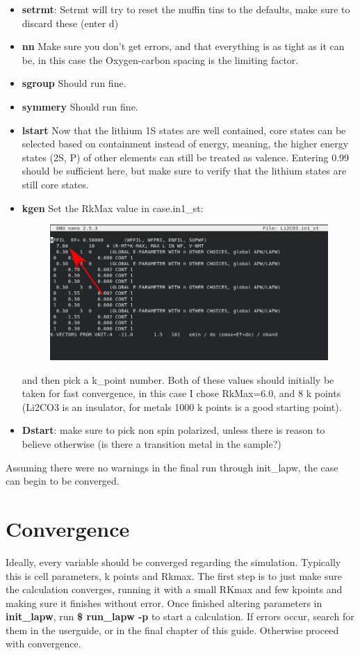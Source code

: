 \documentclass[12pt]{article}
\begin{document}
\begin{itemize}
	\item \textbf{setrmt}: Setrmt will try to reset the muffin tins to the defaults, make sure to discard these (enter d)
	\item \textbf{nn} Make sure you don't get errors, and that everything is as tight as it can be, in this case the Oxygen-carbon spacing is the limiting factor.  
	\item \textbf{sgroup} Should run fine.
	\item  \textbf{symmery} Should run fine. 
	\item \textbf{lstart} Now that the lithium 1S states are well contained, core states can be selected based on containment instead of energy, meaning, the higher energy states (2S, P) of other elements can still be treated as valence.  Entering 0.99 should be sufficient here, but make sure to verify that the lithium states are still core states.
	\item \textbf{kgen} Set the RkMax value in case.in1\_st:		
	\begin{figure}[H]
		\includegraphics[scale=0.4]{./images/init_lapw3.png}
	\end{figure}
	and then pick a k\_point number.  Both of these values should initially be taken for fast convergence, in this case I chose RkMax=6.0, and 8 k points (Li2CO3 is an insulator, for metals 1000 k points is a good starting point).
	\item \textbf{Dstart}: make sure to pick non spin polarized, unless there is reason to believe otherwise (is there a transition metal in the sample?)
\end{itemize}

Assuming there were no warnings in the final run through init\_lapw, the case can begin to be converged.

\section{Convergence}
Ideally, every variable should be converged regarding the simulation.  Typically this is cell parameters, k points and Rkmax.  The first step is to just make sure the calculation converges, running it with a small RKmax and few kpoints and making sure it finishes without error.  Once finished altering parameters in \textbf{init\_lapw}, run \textbf{\$ run\_lapw -p} to start a calculation.  If errors occur, search for them in  the userguide, or in the final chapter of this guide.  Otherwise proceed with convergence.  
\end{document}

